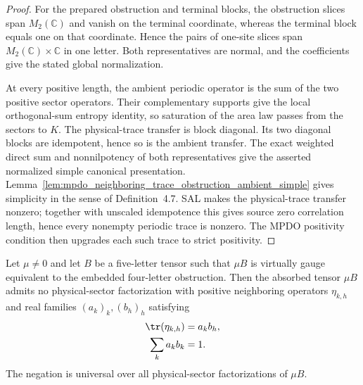 \begin{proof}\leanok
    For the prepared obstruction and terminal blocks, the obstruction slices
    span $M_2(\mathbb C)$ and vanish on the terminal coordinate, whereas the
    terminal block equals one on that coordinate. Hence the pairs of one-site
    slices span $M_2(\mathbb C)\times\mathbb C$ in one letter. Both
    representatives are normal, and the coefficients give the stated global
    normalization.

    At every positive length, the ambient periodic operator is the sum of the
    two positive sector operators. Their complementary supports give the local
    orthogonal-sum entropy identity, so saturation of the area law passes from the
    sectors to $K$. The physical-trace transfer is block diagonal. Its two
    diagonal blocks are idempotent, hence so is the ambient transfer. The
    exact weighted direct sum and nonnilpotency of both representatives give
    the asserted normalized simple canonical presentation.
    Lemma~\ref{lem:mpdo_neighboring_trace_obstruction_ambient_simple} gives
    simplicity in the sense of Definition~4.7. SAL makes the physical-trace
    transfer nonzero; together with unscaled idempotence this gives source zero
    correlation length, hence every nonempty periodic trace is nonzero. The
    MPDO positivity condition then upgrades each such trace to strict
    positivity.
\end{proof}

\begin{lemma}
    \label{thm:mpdo_neighboring_trace_obstruction_absorbed_no_factorization}
    \leanok
    Let $\mu\neq0$ and let $B$ be a five-letter tensor such that $\mu B$ is
    virtually gauge equivalent to the embedded four-letter obstruction. Then
    the absorbed tensor $\mu B$ admits no physical-sector factorization with
    positive neighboring operators $\eta_{k,h}$ and real families
    $(a_k)_k,(b_h)_h$ satisfying
    \begin{align}
        \tr(\eta_{k,h}) & =a_kb_h, \notag \\
        \sum_k a_kb_k   & =1. \notag
    \end{align}
    The negation is universal over all physical-sector factorizations of
    $\mu B$.
\end{lemma}

